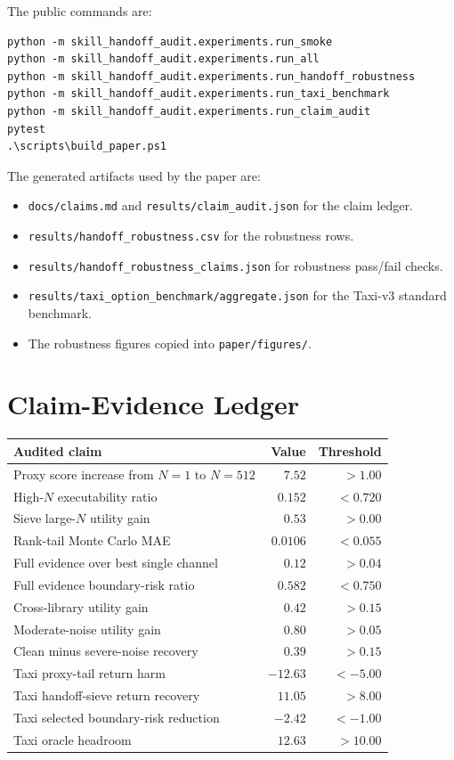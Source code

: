 \documentclass{article}
\begin{document}
The public commands are:
\begin{verbatim}
python -m skill_handoff_audit.experiments.run_smoke
python -m skill_handoff_audit.experiments.run_all
python -m skill_handoff_audit.experiments.run_handoff_robustness
python -m skill_handoff_audit.experiments.run_taxi_benchmark
python -m skill_handoff_audit.experiments.run_claim_audit
pytest
.\scripts\build_paper.ps1
\end{verbatim}

The generated artifacts used by the paper are:
\begin{itemize}
\item \verb|docs/claims.md| and \verb|results/claim_audit.json| for the claim ledger.
\item \verb|results/handoff_robustness.csv| for the robustness rows.
\item \verb|results/handoff_robustness_claims.json| for robustness pass/fail checks.
\item \verb|results/taxi_option_benchmark/aggregate.json| for the Taxi-v3 standard benchmark.
\item The robustness figures copied into \verb|paper/figures/|.
\end{itemize}

\section{Claim-Evidence Ledger}

\begin{center}
\begin{tabular}{lrr}
\toprule
Audited claim & Value & Threshold \\
\midrule
Proxy score increase from \(N=1\) to \(N=512\) & \(7.52\) & \(>1.00\) \\
High-\(N\) executability ratio & \(0.152\) & \(<0.720\) \\
Sieve large-\(N\) utility gain & \(0.53\) & \(>0.00\) \\
Rank-tail Monte Carlo MAE & \(0.0106\) & \(<0.055\) \\
Full evidence over best single channel & \(0.12\) & \(>0.04\) \\
Full evidence boundary-risk ratio & \(0.582\) & \(<0.750\) \\
Cross-library utility gain & \(0.42\) & \(>0.15\) \\
Moderate-noise utility gain & \(0.80\) & \(>0.05\) \\
Clean minus severe-noise recovery & \(0.39\) & \(>0.15\) \\
Taxi proxy-tail return harm & \(-12.63\) & \(<-5.00\) \\
Taxi handoff-sieve return recovery & \(11.05\) & \(>8.00\) \\
Taxi selected boundary-risk reduction & \(-2.42\) & \(<-1.00\) \\
Taxi oracle headroom & \(12.63\) & \(>10.00\) \\
\bottomrule
\end{tabular}
\end{center}
\end{document}

